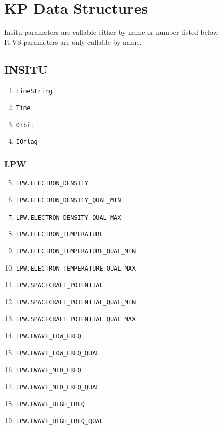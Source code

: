 \documentclass{article}
\begin{document}
\section{KP Data Structures}
\label{sec:kpds}
Insitu parameters are callable either by name or number listed below.\\
IUVS parameters are only callable by name.
\subsection{INSITU}
\begin{enumerate}
    \item \texttt{TimeString}
    \item \texttt{Time}
    \item \texttt{Orbit}
    \item \texttt{IOflag}
\end{enumerate}
\subsubsection{LPW}
\begin{enumerate}
\setcounter{enumi}{4}
    \item \texttt{LPW.ELECTRON\_DENSITY}
    \item \texttt{LPW.ELECTRON\_DENSITY\_QUAL\_MIN}
    \item \texttt{LPW.ELECTRON\_DENSITY\_QUAL\_MAX}
    \item \texttt{LPW.ELECTRON\_TEMPERATURE}
    \item \texttt{LPW.ELECTRON\_TEMPERATURE\_QUAL\_MIN}
    \item \texttt{LPW.ELECTRON\_TEMPERATURE\_QUAL\_MAX}
    \item \texttt{LPW.SPACECRAFT\_POTENTIAL}
    \item \texttt{LPW.SPACECRAFT\_POTENTIAL\_QUAL\_MIN}
    \item \texttt{LPW.SPACECRAFT\_POTENTIAL\_QUAL\_MAX}
    \item \texttt{LPW.EWAVE\_LOW\_FREQ}
    \item \texttt{LPW.EWAVE\_LOW\_FREQ\_QUAL}
    \item \texttt{LPW.EWAVE\_MID\_FREQ}
    \item \texttt{LPW.EWAVE\_MID\_FREQ\_QUAL}
    \item \texttt{LPW.EWAVE\_HIGH\_FREQ}
    \item \texttt{LPW.EWAVE\_HIGH\_FREQ\_QUAL}
\end{enumerate}
\end{document}
